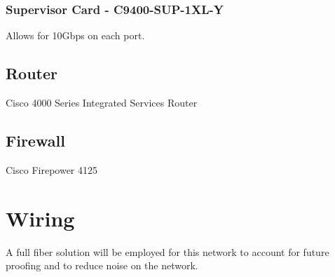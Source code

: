 \subsubsection{Supervisor Card - C9400-SUP-1XL-Y}
Allows for 10Gbps on each port.
\subsection{Router}
Cisco 4000 Series Integrated Services Router
\subsection{Firewall}
Cisco Firepower 4125
\section{Wiring}
A full fiber solution will be employed for this network to account for future proofing and to reduce noise on the network.
